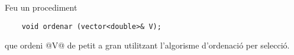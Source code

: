 
Feu un procediment

\begin{lstlisting}
    void ordenar (vector<double>& V);
\end{lstlisting}

que ordeni @V@ de petit a gran utilitzant l'algorisme d'ordenació 
per selecció.


\ObservationNoMain
